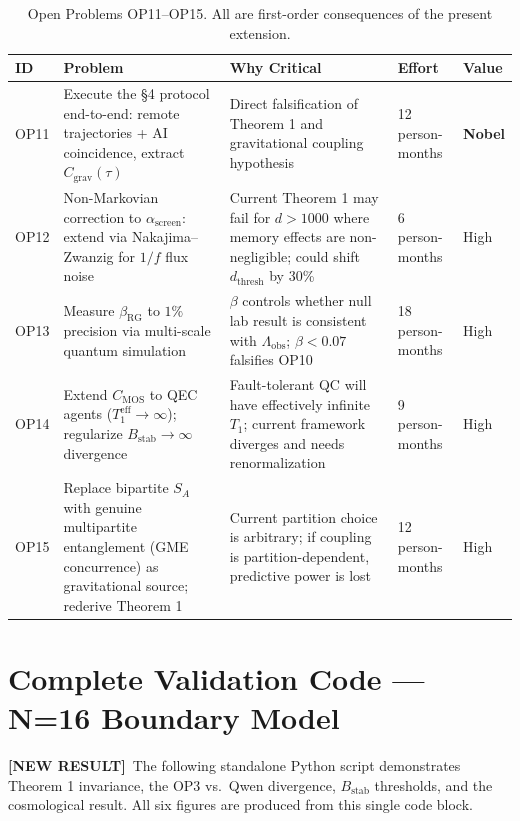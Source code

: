 \documentclass[11pt,letterpaper]{article}
\newcommand{\NEW}{\textcolor{newresult}{\textbf{[NEW RESULT]}}}
\newcommand{\SA}{S_A}
\newcommand{\asc}{\alpha_{\mathrm{screen}}}
\newcommand{\Bstab}{B_{\mathrm{stab}}}
\newcommand{\CMOS}{C_{\mathrm{MOS}}}
\begin{document}
\begin{table}[h!]
\centering\small
\begin{tabular}{p{0.5cm}p{3.5cm}p{4cm}p{1.3cm}p{1cm}}
\toprule
\textbf{ID} & \textbf{Problem} & \textbf{Why Critical} & \textbf{Effort} & \textbf{Value} \\
\midrule
OP11 & Execute the \S4 protocol end-to-end: remote trajectories + AI coincidence, extract $C_{\mathrm{grav}}(\tau)$ & Direct falsification of Theorem 1 and gravitational coupling hypothesis & 12 person-months & \textbf{Nobel} \\
\midrule
OP12 & Non-Markovian correction to $\asc$: extend via Nakajima--Zwanzig for $1/f$ flux noise & Current Theorem 1 may fail for $d > 1000$ where memory effects are non-negligible; could shift $d_{\mathrm{thresh}}$ by 30\% & 6 person-months & High \\
\midrule
OP13 & Measure $\beta_{\mathrm{RG}}$ to $1\%$ precision via multi-scale quantum simulation & $\beta$ controls whether null lab result is consistent with $\Lambda_{\mathrm{obs}}$; $\beta < 0.07$ falsifies OP10 & 18 person-months & High \\
\midrule
OP14 & Extend $\CMOS$ to QEC agents ($T_1^{\mathrm{eff}} \to \infty$); regularize $\Bstab \to \infty$ divergence & Fault-tolerant QC will have effectively infinite $T_1$; current framework diverges and needs renormalization & 9 person-months & High \\
\midrule
OP15 & Replace bipartite $\SA$ with genuine multipartite entanglement (GME concurrence) as gravitational source; rederive Theorem 1 & Current partition choice is arbitrary; if coupling is partition-dependent, predictive power is lost & 12 person-months & High \\
\bottomrule
\end{tabular}
\caption{Open Problems OP11--OP15. All are first-order consequences of the present extension.}
\end{table}

\newpage
\section{Complete Validation Code --- N=16 Boundary Model}

\NEW\ The following standalone Python script demonstrates Theorem 1 invariance, the OP3 vs.\ Qwen divergence, $\Bstab$ thresholds, and the cosmological result. All six figures are produced from this single code block.
\end{document}

